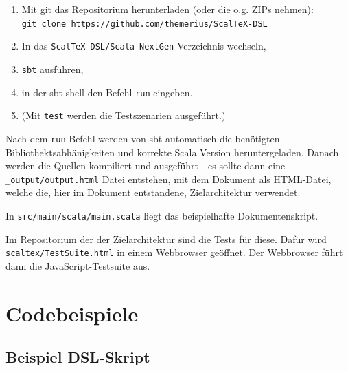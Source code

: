 \begin{enumerate}
  \item Mit git das Repositorium herunterladen (oder die o.g. ZIPs nehmen):\\
        \verb+git clone https://github.com/themerius/ScalTeX-DSL+
  \item In das \verb+ScalTeX-DSL/Scala-NextGen+ Verzeichnis wechseln,
  \item \verb+sbt+ ausführen,
  \item in der sbt-shell den Befehl \verb+run+ eingeben.
  \item (Mit \verb+test+ werden die Testszenarien ausgeführt.)
\end{enumerate}

Nach dem \verb+run+ Befehl werden von sbt automatisch die benötigten
Bibliothektsabhänigkeiten und korrekte Scala Version heruntergeladen.
Danach werden die Quellen kompiliert und ausgeführt---es sollte dann eine
\verb+_output/output.html+ Datei entstehen, mit dem Dokument als HTML-Datei,
welche die, hier im Dokument entstandene, Zielarchitektur verwendet.

In \verb+src/main/scala/main.scala+ liegt das
beispielhafte Dokumentenskript.

Im Repositorium der der Zielarchitektur sind die Tests für diese.
Dafür wird \verb+scaltex/TestSuite.html+ in einem Webbrowser
geöffnet. Der Webbrowser führt dann die JavaScript-Testsuite aus.


\chapter{Codebeispiele}

\section{Beispiel DSL-Skript}\label{sec-api-resultat}


